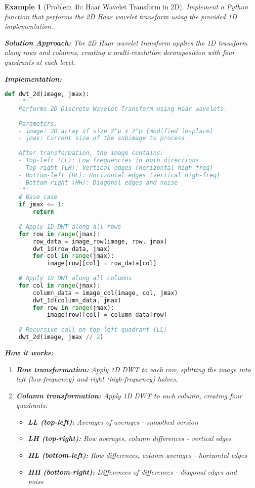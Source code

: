 \documentclass[11pt,a4paper]{article}
\newtheorem{example}[theorem]{Example}
\begin{document}
\begin{example}[Problem 4b: Haar Wavelet Transform in 2D]
Implement a Python function that performs the 2D Haar wavelet transform using the provided 1D implementation.

\textbf{Solution Approach:}
The 2D Haar wavelet transform applies the 1D transform along rows and columns, creating a multi-resolution decomposition with four quadrants at each level.

\textbf{Implementation:}
\begin{lstlisting}[language=Python]
def dwt_2d(image, jmax):
    """
    Performs 2D Discrete Wavelet Transform using Haar wavelets.
    
    Parameters:
    - image: 2D array of size 2^p x 2^p (modified in-place)
    - jmax: Current size of the subimage to process
    
    After transformation, the image contains:
    - Top-left (LL): Low frequencies in both directions
    - Top-right (LH): Vertical edges (horizontal high-freq)
    - Bottom-left (HL): Horizontal edges (vertical high-freq)  
    - Bottom-right (HH): Diagonal edges and noise
    """
    # Base case
    if jmax <= 1:
        return
    
    # Apply 1D DWT along all rows
    for row in range(jmax):
        row_data = image_row(image, row, jmax)
        dwt_1d(row_data, jmax)
        for col in range(jmax):
            image[row][col] = row_data[col]
    
    # Apply 1D DWT along all columns
    for col in range(jmax):
        column_data = image_col(image, col, jmax)
        dwt_1d(column_data, jmax)
        for row in range(jmax):
            image[row][col] = column_data[row]
    
    # Recursive call on top-left quadrant (LL)
    dwt_2d(image, jmax // 2)
\end{lstlisting}

\textbf{How it works:}
\begin{enumerate}
    \item \textbf{Row transformation:} Apply 1D DWT to each row, splitting the image into left (low-frequency) and right (high-frequency) halves.
    
    \item \textbf{Column transformation:} Apply 1D DWT to each column, creating four quadrants:
    \begin{itemize}
        \item \textbf{LL (top-left):} Averages of averages - smoothed version
        \item \textbf{LH (top-right):} Row averages, column differences - vertical edges
        \item \textbf{HL (bottom-left):} Row differences, column averages - horizontal edges
        \item \textbf{HH (bottom-right):} Differences of differences - diagonal edges and noise
    \end{itemize}
    

\end{enumerate}
\end{example}
\end{document}
